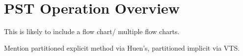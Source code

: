 \chapter{PST Operation Overview}

This is likely to include a flow chart/ multiple flow charts.

Mention partitioned explicit method via Huen's, partitioned implicit via VTS.